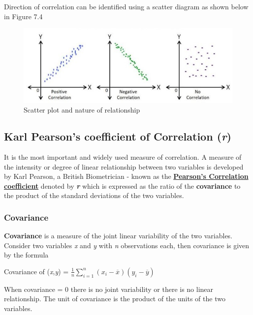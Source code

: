 \documentclass[
]{book}
\begin{document}
Direction of correlation can be identified using a scatter diagram as
shown below in Figure 7.4

\begin{figure}

{\centering \includegraphics[width=0.7\linewidth]{images/image4c} 

}

\caption{Scatter plot and nature of relationship}\label{fig:c4}
\end{figure}

\subsection{\texorpdfstring{Karl Pearson's coefficient of Correlation (\emph{r})}{Karl Pearson's coefficient of Correlation (r)}}\label{karl-pearsons-coefficient-of-correlation-r}

It is the most important and widely used measure of correlation. A
measure of the intensity or degree of linear relationship between two
variables is developed by Karl Pearson, a British Biometrician - known
as the \ul{\textbf{Pearson's Correlation coefficient}} denoted by
\textbf{\emph{r}} which is expressed as the ratio of the \textbf{covariance} to the
product of the standard deviations of the two variables.

\subsubsection{Covariance}\label{covariance}

\textbf{Covariance} is a measure of the joint linear variability of the two
variables. Consider two variables \emph{x} and \emph{y} with \emph{n} observations
each, then covariance is given by the formula

Covariance of (\emph{x},\emph{y}) =
\(\frac{1}{n}\sum_{i = 1}^{n}{\left( x_{i} - \overline{x} \right)\left( y_{i} - \overline{y} \right)}\)

When covariance = 0 there is no joint variability or there is no linear
relationship. The unit of covariance is the product of the units of the
two variables.
\end{document}
